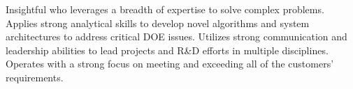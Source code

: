 

\begin{cvparagraph}

Insightful who leverages a breadth of expertise to solve complex problems. Applies strong analytical skills to develop novel algorithms and system architectures to address critical DOE issues. Utilizes strong communication and leadership abilities to lead projects and R\&D efforts in multiple disciplines. Operates with a strong focus on meeting and exceeding all of the customers’ requirements.
\end{cvparagraph}
